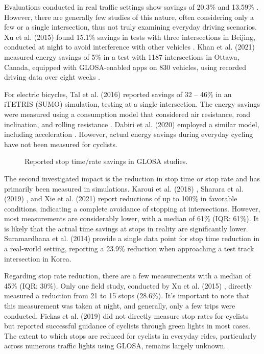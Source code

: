 Evaluations conducted in real traffic settings show savings of 20.3\% \cite{koukoumidis_signalguru_2011} and 13.59\% \cite{xia_field_2012}. However, there are generally few studies of this nature, often considering only a few or a single intersection, thus not truly examining everyday driving scenarios. Xu et al. (2015) found 15.1\% savings in tests with three intersections in Beijing, conducted at night to avoid interference with other vehicles \cite{xu_bb_2015}. Khan et al. (2021) measured energy savings of 5\% in a test with 1187 intersections in Ottawa, Canada, equipped with GLOSA-enabled apps on 830 vehicles, using recorded driving data over eight weeks \cite{khan_eco-drive_2021}.

For electric bicycles, Tal et al. (2016) reported savings of 32 -- 46\% in an iTETRIS (SUMO) simulation, testing at a single intersection. The energy savings were measured using a consumption model that considered air resistance, road inclination, and rolling resistance \cite{tal_vehicular-communications-based_2016}. Dabiri et al. (2020) employed a similar model, including acceleration \cite{dabiri_optimized_2020}. However, actual energy savings during everyday cycling have not been measured for cyclists.

\begin{figure}
\centering
\resizebox{\linewidth}{!}{%

}
\caption{Reported stop time/rate savings in GLOSA studies.}
\label{fig:related-work-stops}
\end{figure}

The second investigated impact is the reduction in stop time or stop rate and has primarily been measured in simulations. Karoui et al. (2018) \cite{karoui_efficiency_2018}, Sharara et al. (2019) \cite{sharara_impact_2019}, and Xie et al. (2021) \cite{xie_dynamic_2021} report reductions of up to 100\% in favorable conditions, indicating a complete avoidance of stopping at intersections. However, most measurements are considerably lower, with a median of 61\% (IQR: 61\%). It is likely that the actual time savings at stops in reality are significantly lower. Suramardhana et al. (2014) \cite{suramardhana_driver-centric_2014} provide a single data point for stop time reduction in a real-world setting, reporting a 23.9\% reduction when approaching a test track intersection in Korea.

Regarding stop rate reduction, there are a few measurements with a median of 45\% (IQR: 30\%). Only one field study, conducted by Xu et al. (2015) \cite{xu_bb_2015}, directly measured a reduction from 21 to 15 stops (28.6\%). It's important to note that this measurement was taken at night, and generally, only a few trips were conducted. Fickas et al. (2019) \cite{fickas_fast_2019} did not directly measure stop rates for cyclists but reported successful guidance of cyclists through green lights in most cases. The extent to which stops are reduced for cyclists in everyday rides, particularly across numerous traffic lights using GLOSA, remains largely unknown.

